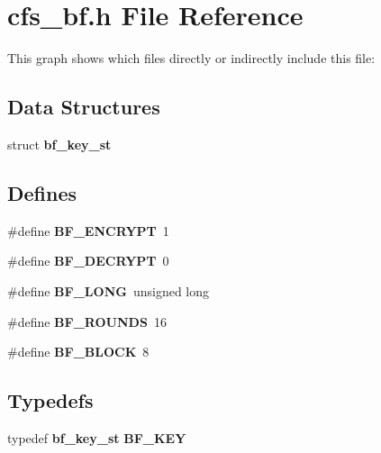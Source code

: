 \section{cfs\_\-bf.h File Reference}
\label{cfs__bf_8h}




This graph shows which files directly or indirectly include this file:\subsection*{Data Structures}
\begin{CompactItemize}
\item 
struct {\bf bf\_\-key\_\-st}
\end{CompactItemize}
\subsection*{Defines}
\begin{CompactItemize}
\item 
\#define {\bf BF\_\-ENCRYPT}\ 1
\item 
\#define {\bf BF\_\-DECRYPT}\ 0
\item 
\#define {\bf BF\_\-LONG}\ unsigned long
\item 
\#define {\bf BF\_\-ROUNDS}\ 16
\item 
\#define {\bf BF\_\-BLOCK}\ 8
\end{CompactItemize}
\subsection*{Typedefs}
\begin{CompactItemize}
\item 
typedef {\bf bf\_\-key\_\-st} {\bf BF\_\-KEY}
\end{CompactItemize}
